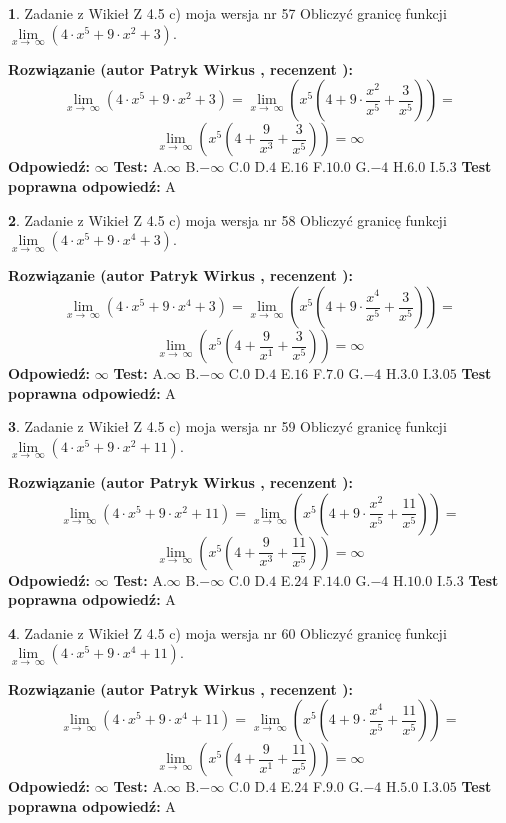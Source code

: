 \documentclass[12pt, a4paper]{article}
\theoremstyle{definition} %
\newtheorem{zad}{}
\newcommand{\zadStart}[1]{\begin{zad}#1\newline}
\newcommand{\zadStop}{\end{zad}}
\newcommand{\rozwStart}[2]{\noindent \textbf{Rozwiązanie (autor #1 , recenzent #2): }\newline}
\newcommand{\rozwStop}{\newline}
\newcommand{\odpStart}{\noindent \textbf{Odpowiedź:}\newline}
\newcommand{\odpStop}{\newline}
\newcommand{\testStart}{\noindent \textbf{Test:}\newline}
\newcommand{\testStop}{\newline}
\newcommand{\kluczStart}{\noindent \textbf{Test poprawna odpowiedź:}\newline}
\newcommand{\kluczStop}{\newline}
\begin{document}
\zadStart{Zadanie z Wikieł Z 4.5 c) moja wersja nr 57}
Obliczyć granicę funkcji  $\lim\limits_{x\to\ \infty}(4 \cdot x^{5}+9 \cdot x^{2}+3)$.
\zadStop
\rozwStart{Patryk Wirkus}{}
$$\lim\limits_{x\to\ \infty}(4 \cdot x^{5}+9 \cdot x^{2}+3) = \lim\limits_{x\to\ \infty}(x^{5}(4 +9 \cdot \frac{x^{2}}{x^{5}}+\frac{3}{x^{5}})) =$$ $$\lim\limits_{x\to\ \infty}(x^{5}(4 +\frac{9}{x^{3}}+\frac{3}{x^{5}})) =\infty$$
\rozwStop
\odpStart
$\infty$
\odpStop
\testStart
A.$\infty$ B.$-\infty$ C.$0$ D.$4$ E.$16$
F.$10.0$ G.$-4$
H.$6.0$
I.$5.3$
\testStop
\kluczStart
A
\kluczStop



\zadStart{Zadanie z Wikieł Z 4.5 c) moja wersja nr 58}
Obliczyć granicę funkcji  $\lim\limits_{x\to\ \infty}(4 \cdot x^{5}+9 \cdot x^{4}+3)$.
\zadStop
\rozwStart{Patryk Wirkus}{}
$$\lim\limits_{x\to\ \infty}(4 \cdot x^{5}+9 \cdot x^{4}+3) = \lim\limits_{x\to\ \infty}(x^{5}(4 +9 \cdot \frac{x^{4}}{x^{5}}+\frac{3}{x^{5}})) =$$ $$\lim\limits_{x\to\ \infty}(x^{5}(4 +\frac{9}{x^{1}}+\frac{3}{x^{5}})) =\infty$$
\rozwStop
\odpStart
$\infty$
\odpStop
\testStart
A.$\infty$ B.$-\infty$ C.$0$ D.$4$ E.$16$
F.$7.0$ G.$-4$
H.$3.0$
I.$3.05$
\testStop
\kluczStart
A
\kluczStop



\zadStart{Zadanie z Wikieł Z 4.5 c) moja wersja nr 59}
Obliczyć granicę funkcji  $\lim\limits_{x\to\ \infty}(4 \cdot x^{5}+9 \cdot x^{2}+11)$.
\zadStop
\rozwStart{Patryk Wirkus}{}
$$\lim\limits_{x\to\ \infty}(4 \cdot x^{5}+9 \cdot x^{2}+11) = \lim\limits_{x\to\ \infty}(x^{5}(4 +9 \cdot \frac{x^{2}}{x^{5}}+\frac{11}{x^{5}})) =$$ $$\lim\limits_{x\to\ \infty}(x^{5}(4 +\frac{9}{x^{3}}+\frac{11}{x^{5}})) =\infty$$
\rozwStop
\odpStart
$\infty$
\odpStop
\testStart
A.$\infty$ B.$-\infty$ C.$0$ D.$4$ E.$24$
F.$14.0$ G.$-4$
H.$10.0$
I.$5.3$
\testStop
\kluczStart
A
\kluczStop



\zadStart{Zadanie z Wikieł Z 4.5 c) moja wersja nr 60}
Obliczyć granicę funkcji  $\lim\limits_{x\to\ \infty}(4 \cdot x^{5}+9 \cdot x^{4}+11)$.
\zadStop
\rozwStart{Patryk Wirkus}{}
$$\lim\limits_{x\to\ \infty}(4 \cdot x^{5}+9 \cdot x^{4}+11) = \lim\limits_{x\to\ \infty}(x^{5}(4 +9 \cdot \frac{x^{4}}{x^{5}}+\frac{11}{x^{5}})) =$$ $$\lim\limits_{x\to\ \infty}(x^{5}(4 +\frac{9}{x^{1}}+\frac{11}{x^{5}})) =\infty$$
\rozwStop
\odpStart
$\infty$
\odpStop
\testStart
A.$\infty$ B.$-\infty$ C.$0$ D.$4$ E.$24$
F.$9.0$ G.$-4$
H.$5.0$
I.$3.05$
\testStop
\kluczStart
A
\kluczStop
\end{document}
